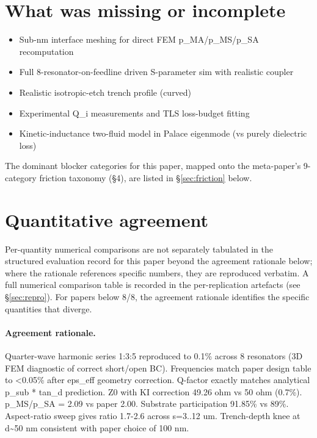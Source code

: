 \documentclass[11pt]{article}
\begin{document}
\section{What was missing or incomplete}
\begin{itemize}
\item Sub-nm interface meshing for direct FEM p\_MA/p\_MS/p\_SA recomputation
\item Full 8-resonator-on-feedline driven S-parameter sim with realistic coupler
\item Realistic isotropic-etch trench profile (curved)
\item Experimental Q\_i measurements and TLS loss-budget fitting
\item Kinetic-inductance two-fluid model in Palace eigenmode (vs purely dielectric loss)
\end{itemize}
The dominant blocker categories for this paper, mapped onto the meta-paper's 9-category friction taxonomy (\S4), are listed in \S\ref{sec:friction} below.

\section{Quantitative agreement}
Per-quantity numerical comparisons are not separately tabulated in the structured evaluation record for this paper beyond the agreement rationale below; where the rationale references specific numbers, they are reproduced verbatim. A full numerical comparison table is recorded in the per-replication artefacts (see \S\ref{sec:repro}). For papers below 8/8, the agreement rationale identifies the specific quantities that diverge.

\paragraph{Agreement rationale.} Quarter-wave harmonic series 1:3:5 reproduced to 0.1\% across 8 resonators (3D FEM diagnostic of correct short/open BC). Frequencies match paper design table to \textless{}0.05\% after eps\_eff geometry correction. Q-factor exactly matches analytical p\_sub * tan\_d prediction. Z0 with KI correction 49.26 ohm vs 50 ohm (0.7\%). p\_MS/p\_SA = 2.09 vs paper 2.00. Substrate participation 91.85\% vs 89\%. Aspect-ratio sweep gives ratio 1.7-2.6 across s=3..12 um. Trench-depth knee at d\textasciitilde{}50 nm consistent with paper choice of 100 nm.
\end{document}
